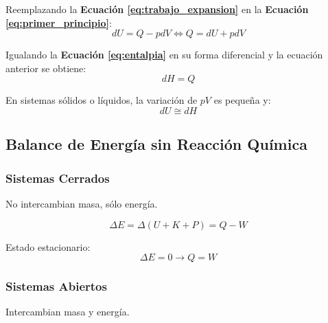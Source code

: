         Reemplazando la \textbf{Ecuación \ref{eq:trabajo_expansion}} en la \textbf{Ecuación \ref{eq:primer_principio}}:
        \[dU = Q - pdV \Leftrightarrow Q = dU + pdV\]
        
        Igualando la \textbf{Ecuación \ref{eq:entalpia}} en su forma diferencial y la ecuación anterior se obtiene:
        \begin{equation}
        \label{eq:h_q}
            dH = Q
        \end{equation}
        
        \begin{quote}
            \textit{}
        \end{quote}
        
        En sistemas sólidos o líquidos, la variación de \(pV\) es pequeña y:
        \begin{equation}
        \label{eq:sis_sol_liq_e_int}
            dU \cong dH
        \end{equation}
    
    \subsection{Balance de Energía sin Reacción Química}
    
        \subsubsection{Sistemas Cerrados}
        
        No intercambian masa, sólo energía.
        
        \begin{equation}
        \label{eq:energia_sis_cerrado}
            \Delta E = \Delta \left ( U + K + P \right ) = Q - W
        \end{equation}
        
        Estado estacionario:
        \begin{equation}
        \label{eq:energia_sis_cerrado_estacionario}
            \Delta E = 0 \rightarrow Q = W
        \end{equation}
        
        \subsubsection{Sistemas Abiertos}
        
        Intercambian masa y energía.
        
